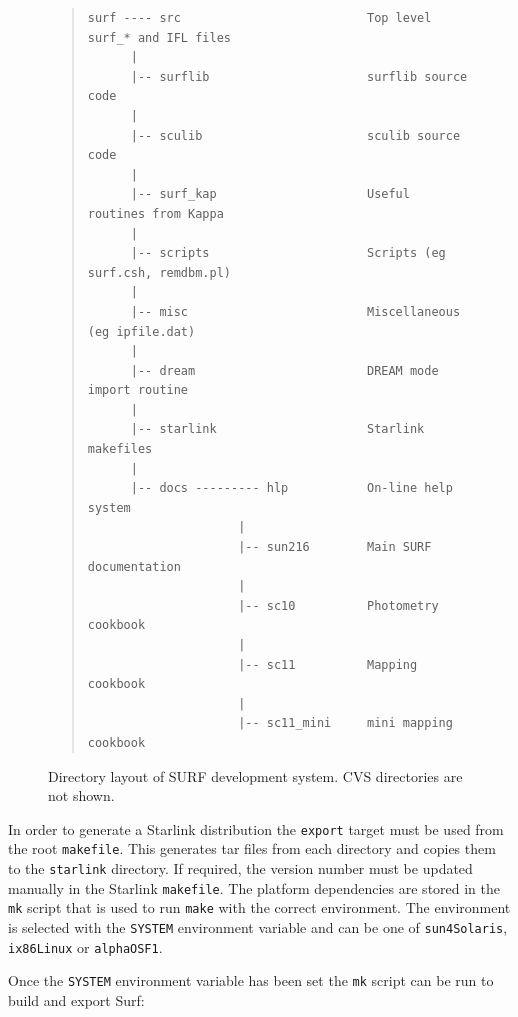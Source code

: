 \documentclass[twoside,11pt]{article}
\newenvironment{myquote}{\begin{quote}\begin{small}}{\end{small}\end{quote}}
\newcommand{\scusoft}          {{\sc Surf}}
\renewcommand{\_}{\texttt{\symbol{95}}}
\begin{document}
\begin{figure}
\begin{center}
\begin{myquote}
\begin{verbatim}
surf ---- src                          Top level surf_* and IFL files
      |
      |-- surflib                      surflib source code
      |
      |-- sculib                       sculib source code
      |
      |-- surf_kap                     Useful routines from Kappa
      |
      |-- scripts                      Scripts (eg surf.csh, remdbm.pl)
      |
      |-- misc                         Miscellaneous (eg ipfile.dat)
      |
      |-- dream                        DREAM mode import routine
      |
      |-- starlink                     Starlink makefiles
      |
      |-- docs --------- hlp           On-line help system
                     |
                     |-- sun216        Main SURF documentation
                     |
                     |-- sc10          Photometry cookbook
                     |
                     |-- sc11          Mapping cookbook
                     |
                     |-- sc11_mini     mini mapping cookbook
\end{verbatim}
\end{myquote}
\end{center}
\caption{Directory layout of SURF development system. CVS directories are not
shown.}
\label{surf:devel}
\end{figure}

In order to generate a Starlink distribution the \texttt{export} target must
be used from the root \texttt{makefile}. This generates tar files from each
directory and copies them to the \texttt{starlink} directory.  If required, the
version number must be updated manually in the Starlink \texttt{makefile}.
The platform dependencies are stored in the \texttt{mk} script that is used
to run \texttt{make} with the correct environment. The environment is selected
with the \texttt{SYSTEM} environment variable and can be one of 
\texttt{sun4\_Solaris}, \texttt{ix86\_Linux} or \texttt{alpha\_OSF1}.

Once the \texttt{SYSTEM} environment variable has been set the \texttt{mk}
script can be run to build and export \scusoft:
\end{document}
